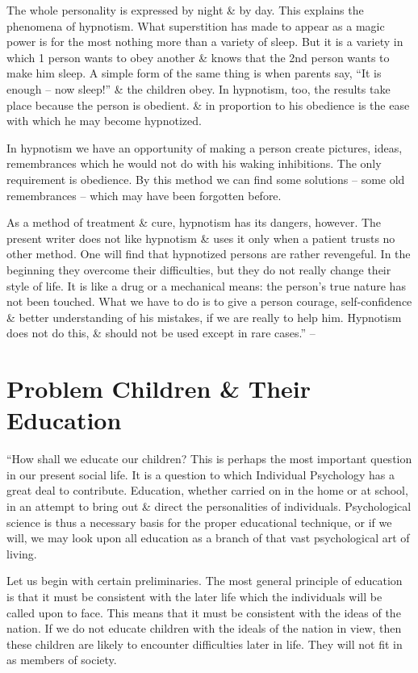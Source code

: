 \documentclass{article}
\begin{document}
The whole personality is expressed by night \& by day. This explains the phenomena of hypnotism. What superstition has made to appear as a magic power is for the most nothing more than a variety of sleep. But it is a variety in which 1 person wants to obey another \& knows that the 2nd person wants to make him sleep. A simple form of the same thing is when parents say, ``It is enough -- now sleep!'' \& the children obey. In hypnotism, too, the results take place because the person is obedient. \& in proportion to his obedience is the ease with which he may become hypnotized.

In hypnotism we have an opportunity of making a person create pictures, ideas, remembrances which he would not do with his waking inhibitions. The only requirement is obedience. By this method we can find some solutions -- some old remembrances -- which may have been forgotten before.

As a method of treatment \& cure, hypnotism has its dangers, however. The present writer does not like hypnotism \& uses it only when a patient trusts no other method. One will find that hypnotized persons are rather revengeful. In the beginning they overcome their difficulties, but they do not really change their style of life. It is like a drug or a mechanical means: the person's true nature has not been touched. What we have to do is to give a person courage, self-confidence \& better understanding of his mistakes, if we are really to help him. Hypnotism does not do this, \& should not be used except in rare cases.'' -- \cite[pp. 154--172]{Adler_science_living}


\section{Problem Children \& Their Education}
``How shall we educate our children? This is perhaps the most important question in our present social life. It is a question to which Individual Psychology has a great deal to contribute. Education, whether carried on in the home or at school, in an attempt to bring out \& direct the personalities of individuals. Psychological science is thus a necessary basis for the proper educational technique, or if we will, we may look upon all education as a branch of that vast psychological art of living.

Let us begin with certain preliminaries. The most general principle of education is that it must be consistent with the later life which the individuals will be called upon to face. This means that it must be consistent with the ideas of the nation. If we do not educate children with the ideals of the nation in view, then these children are likely to encounter difficulties later in life. They will not fit in as members of society.
\end{document}
